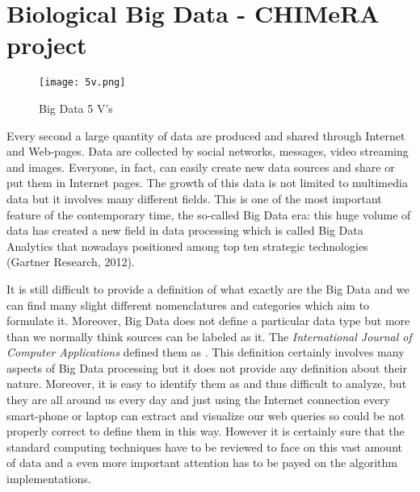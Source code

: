 \documentclass{standalone}
\begin{document}
\chapter[Big Data]{Biological Big Data - CHIMeRA project}\label{chapter3:bigdata}

\begin{center}
\begin{figure}[htbp]
\centering
\texttt{[image: 5v.png]}
\caption{Big Data 5 V's}
\label{fig:5v}
\end{figure}
\end{center}

Every second a large quantity of data are produced and shared through Internet and Web-pages.
Data are collected by social networks, messages, video streaming and images.
Everyone, in fact, can easily create new data sources and share or put them in Internet pages.
The growth of this data is not limited to multimedia data but it involves many different fields.
This is one of the most important feature of the contemporary time, the so-called Big Data era: this huge volume of data has created a new field in data processing which is called Big Data Analytics that nowadays positioned among top ten strategic technologies (Gartner Research, 2012).

It is still difficult to provide a definition of what exactly are the Big Data and we can find many slight different nomenclatures and categories which aim to formulate it.
Moreover, Big Data does not define a particular data type but more than we normally think sources can be labeled as it.
The \emph{International Journal of Computer Applications} defined them as .
This definition certainly involves many aspects of Big Data processing but it does not provide any definition about their nature.
Moreover, it is easy to identify them as  and thus difficult to analyze, but they are all around us every day and just using the Internet connection every smart-phone or laptop can extract and visualize our web queries so could be not properly correct to define them in this way.
However it is certainly sure that the standard computing techniques have to be reviewed to face on this vast amount of data and a even more important attention has to be payed on the algorithm implementations.
\end{document}

